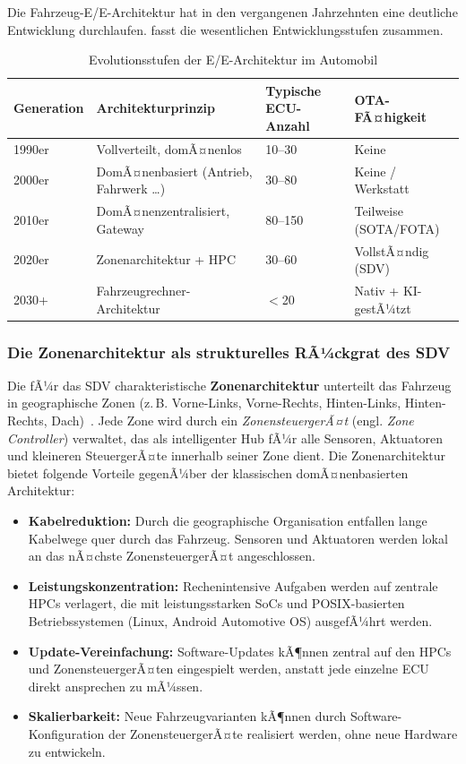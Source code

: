 ﻿\documentclass[12pt,a4paper,twoside]{article}
\begin{document}
Die Fahrzeug-E/E-Architektur hat in den vergangenen Jahrzehnten eine deutliche
Entwicklung durchlaufen.  fasst die wesentlichen
Entwicklungsstufen zusammen.

\begin{table}[htbp]
  \centering
  \caption{Evolutionsstufen der E/E-Architektur im Automobil}
  \label{tab:ee_evolution}
  \begin{tabularx}{\textwidth}{lXXX}
    \toprule
    \textbf{Generation} & \textbf{Architekturprinzip} & \textbf{Typische ECU-Anzahl}
      & \textbf{OTA-FÃ¤higkeit} \\
    \midrule
    1990er & Vollverteilt, domÃ¤nenlos & 10--30 & Keine \\
    2000er & DomÃ¤nenbasiert (Antrieb, Fahrwerk \ldots) & 30--80 & Keine / Werkstatt \\
    2010er & DomÃ¤nenzentralisiert, Gateway & 80--150 & Teilweise (SOTA/FOTA) \\
    2020er & Zonenarchitektur + HPC & 30--60 & VollstÃ¤ndig (SDV) \\
    2030+ & Fahrzeugrechner-Architektur & $<$20 & Nativ + KI-gestÃ¼tzt \\
    \bottomrule
  \end{tabularx}
\end{table}

\subsubsection{Die Zonenarchitektur als strukturelles RÃ¼ckgrat des SDV}

Die fÃ¼r das SDV charakteristische \textbf{Zonenarchitektur} unterteilt das
Fahrzeug in geographische Zonen (z.\,B. Vorne-Links, Vorne-Rechts, Hinten-Links,
Hinten-Rechts, Dach)~\cite{schneider2026ladekomm}. Jede Zone wird durch ein
\emph{ZonensteuergerÃ¤t} (engl. \textit{Zone Controller}) verwaltet, das als
intelligenter Hub fÃ¼r alle Sensoren, Aktuatoren und kleineren SteuergerÃ¤te
innerhalb seiner Zone dient. Die Zonenarchitektur bietet folgende Vorteile
gegenÃ¼ber der klassischen domÃ¤nenbasierten Architektur:

\begin{itemize}
  \item \textbf{Kabelreduktion:} Durch die geographische Organisation entfallen
    lange Kabelwege quer durch das Fahrzeug. Sensoren und Aktuatoren werden lokal
    an das nÃ¤chste ZonensteuergerÃ¤t angeschlossen.
  \item \textbf{Leistungskonzentration:} Rechenintensive Aufgaben werden auf
    zentrale HPCs verlagert, die mit leistungsstarken SoCs und POSIX-basierten
    Betriebssystemen (Linux, Android Automotive OS) ausgefÃ¼hrt werden.
  \item \textbf{Update-Vereinfachung:} Software-Updates kÃ¶nnen zentral auf den
    HPCs und ZonensteuergerÃ¤ten eingespielt werden, anstatt jede einzelne ECU
    direkt ansprechen zu mÃ¼ssen.
  \item \textbf{Skalierbarkeit:} Neue Fahrzeugvarianten kÃ¶nnen durch Software-
    Konfiguration der ZonensteuergerÃ¤te realisiert werden, ohne neue Hardware zu
    entwickeln.
\end{itemize}
\end{document}
